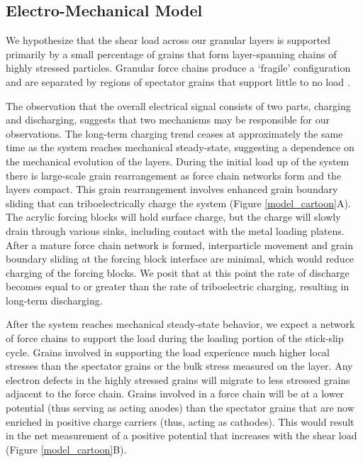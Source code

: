 \subsection{Electro-Mechanical Model}
We hypothesize that the shear load across our granular layers is supported primarily by a small percentage of grains that form layer-spanning chains of highly stressed particles. Granular force chains produce a `fragile' configuration and are separated by regions of spectator grains that support little to no load \citep{Sammis:2013td,Liu:1995vx,Liu:1998wy,Cates:1998ie,Boettcher:1999tn,Albert:2001hs,Aharonov:1999uo}.

The observation that the overall electrical signal consists of two parts, charging and discharging, suggests that two mechanisms may be responsible for our observations. The long-term charging trend ceases at approximately the same time as the system reaches mechanical steady-state, suggesting a dependence on the mechanical evolution of the layers.  During the initial load up of the system there is large-scale grain rearrangement as force chain networks form and the layers compact.  This grain rearrangement involves enhanced grain boundary sliding that can triboelectrically charge the system (Figure \ref{model_cartoon}A).  The acrylic forcing blocks will hold surface charge, but the charge will slowly drain through various sinks, including contact with the metal loading platens.  After a mature force chain network is formed, interparticle movement and grain boundary sliding at the forcing block interface are minimal, which would reduce charging of the forcing blocks.  We posit that at this point the rate of discharge becomes equal to or greater than the rate of triboelectric charging, resulting in long-term discharging.

After the system reaches mechanical steady-state behavior, we expect a network of force chains to support the load during the loading portion of the stick-slip cycle.  Grains involved in supporting the load experience much higher local stresses than the spectator grains or the bulk stress measured on the layer.  Any electron defects in the highly stressed grains will migrate to less stressed grains adjacent to the force chain.  Grains involved in a force chain will be at a lower potential (thus serving as acting anodes) than the spectator grains that are now enriched in positive charge carriers (thus, acting as cathodes).  This would result in the net measurement of a positive potential that increases with the shear load (Figure \ref{model_cartoon}B).

